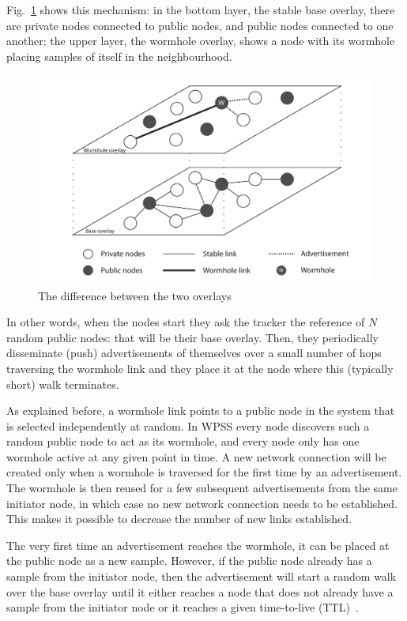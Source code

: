 Fig.~\ref{fig:overlay} shows this mechanism: in the bottom layer, the stable base overlay, there are private nodes connected to public nodes, and public nodes connected to one another; the upper layer, the wormhole overlay, shows a node with its wormhole placing samples of itself in the neighbourhood.

\begin{figure}[ht]
  \centering
  \includegraphics[keepaspectratio=true, width=\textwidth]{images/overlay.pdf}\caption{The difference between the two overlays}
  \label{fig:overlay}
\end{figure}

In other words, when the nodes start they ask the tracker the reference of $N$ random public nodes: that will be their base overlay. Then, they periodically disseminate (push) advertisements of themselves over a small number of hops traversing the wormhole link and they place it at the node where this (typically short) walk terminates.

As explained before, a wormhole link points to a public node in the system that is selected independently at random. In \ac{WPSS} every node discovers such a random public node to act as its wormhole, and every node only has one wormhole active at any given point in time. A new network connection will be created only when a wormhole is traversed for the first time by an advertisement. The wormhole is then reused for a few subsequent advertisements from the same initiator node, in which case no new network connection needs to be established. This makes it possible to decrease the number of new links established.

The very first time an advertisement reaches the wormhole, it can be placed at the public node as a new sample. However, if the public node already has a sample from the initiator node, then the advertisement will start a random walk over the base overlay until it either reaches a node that does not already have a sample from the initiator node or it reaches a given time-to-live (TTL)~\cite{wormhole}.

